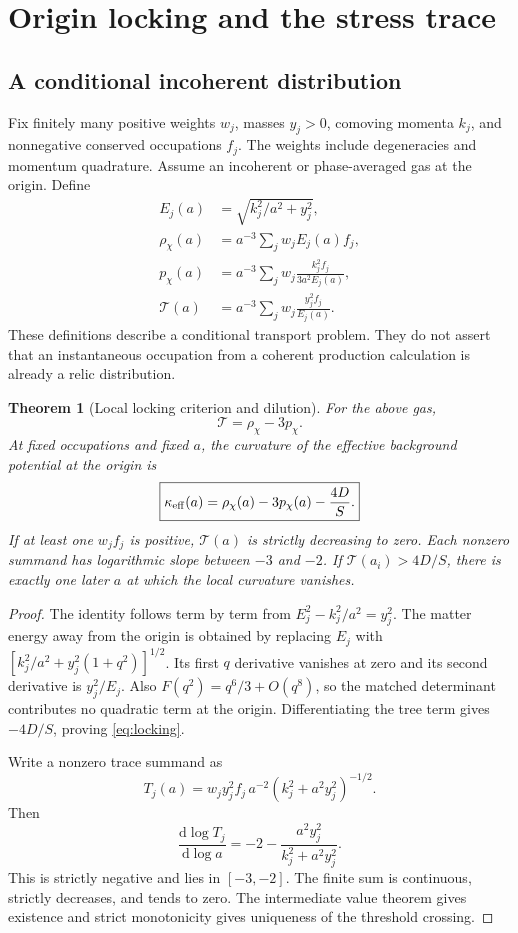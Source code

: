 \documentclass[11pt]{article}
\newtheorem{theorem}{Theorem}[section]\newtheorem{proposition}[theorem]{Proposition}\newtheorem{corollary}[theorem]{Corollary}
\theoremstyle{definition}\newtheorem{definition}[theorem]{Definition}
\newcommand{\dd}{\mathrm d}\newcommand{\Tr}{\mathcal T}\newcommand{\Ezero}{E_0}
\begin{document}
\section{Origin locking and the stress trace}
\subsection{A conditional incoherent distribution}
Fix finitely many positive weights $w_j$, masses $y_j>0$, comoving momenta $k_j$, and nonnegative conserved occupations $f_j$. The weights include degeneracies and momentum quadrature. Assume an incoherent or phase-averaged gas at the origin. Define
\begin{align}
E_j(a)&=\sqrt{k_j^2/a^2+y_j^2},\\
\rho_\chi(a)&=a^{-3}\sum_jw_jE_j(a)f_j,\\
p_\chi(a)&=a^{-3}\sum_jw_j\frac{k_j^2f_j}{3a^2E_j(a)},\\
\Tr(a)&=a^{-3}\sum_jw_j\frac{y_j^2f_j}{E_j(a)}.
\end{align}
These definitions describe a conditional transport problem. They do not assert that an instantaneous occupation from a coherent production calculation is already a relic distribution.

\begin{theorem}[Local locking criterion and dilution]\label{thm:trace}
For the above gas,
\begin{equation}
\Tr=\rho_\chi-3p_\chi.
\end{equation}
At fixed occupations and fixed $a$, the curvature of the effective background potential at the origin is
\begin{equation}
\boxed{\kappa_{\rm eff}(a)=\rho_\chi(a)-3p_\chi(a)-\frac{4D}{S}.}\label{eq:locking}
\end{equation}
If at least one $w_jf_j$ is positive, $\Tr(a)$ is strictly decreasing to zero. Each nonzero summand has logarithmic slope between $-3$ and $-2$. If $\Tr(a_i)>4D/S$, there is exactly one later $a$ at which the local curvature vanishes.
\end{theorem}
\begin{proof}
The identity follows term by term from $E_j^2-k_j^2/a^2=y_j^2$. The matter energy away from the origin is obtained by replacing $E_j$ with
$[k_j^2/a^2+y_j^2(1+q^2)]^{1/2}$. Its first $q$ derivative vanishes at zero and its second derivative is $y_j^2/E_j$. Also $F(q^2)=q^6/3+O(q^8)$, so the matched determinant contributes no quadratic term at the origin. Differentiating the tree term gives $-4D/S$, proving \eqref{eq:locking}.

Write a nonzero trace summand as
\[
T_j(a)=w_jy_j^2f_j\,a^{-2}(k_j^2+a^2y_j^2)^{-1/2}.
\]
Then
\begin{equation}
\frac{\dd\log T_j}{\dd\log a}=-2-\frac{a^2y_j^2}{k_j^2+a^2y_j^2}.
\end{equation}
This is strictly negative and lies in $[-3,-2]$. The finite sum is continuous, strictly decreases, and tends to zero. The intermediate value theorem gives existence and strict monotonicity gives uniqueness of the threshold crossing.
\end{proof}
\end{document}

